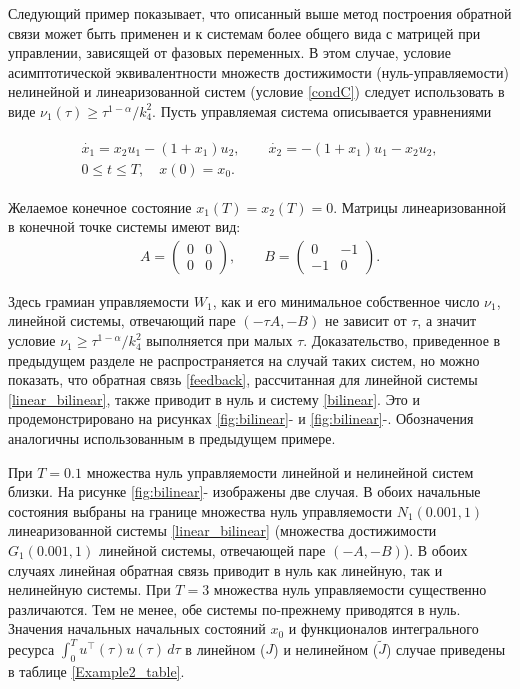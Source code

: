 \documentclass[../main.tex]{subfiles}
\begin{document}
\begin{pr}
Следующий пример показывает, что описанный выше метод построения обратной связи может быть применен и к системам более общего вида с матрицей при управлении, зависящей от фазовых переменных. В этом случае, условие  асимптотической эквивалентности  множеств достижимости (нуль-управляемости) нелинейной и линеаризованной систем (условие \ref{condC}) следует использовать в виде $ \nu_1(\tau) \geqslant \tau^{1 - \alpha} / k_4^2 $.   Пусть управляемая  система описывается уравнениями

\begin{gather}\label{bilinear}
\begin{gathered}
    \dot{x_1} = x_2 u_1 - (1 + x_1) u_2, \qquad \dot{x_2} = -(1+x_1) u_1 - x_2 u_2, \\
    0 \leqslant t \leqslant T, \quad
    x(0) = x_0.
    \end{gathered}
\end{gather}

Желаемое конечное состояние $ x_1(T) = x_2(T) =  0 $. Матрицы линеаризованной в конечной точке системы имеют вид:
\begin{gather}\label{linear_bilinear}
    A = \begin{pmatrix}
        0 & 0\\
        0 & 0
    \end{pmatrix}, \qquad 
    B = \begin{pmatrix}
        0 & -1 \\
        -1 & 0
    \end{pmatrix}.
\end{gather}
 
Здесь грамиан управляемости $ W_1 $, как и его минимальное собственное число $ \nu_1 $, линейной системы, отвечающий паре  $(-\tau A, -B) $ не зависит от $ \tau $, а значит условие $ \nu_1 \geqslant \tau^{1 - \alpha} / k_4^2 $ выполняется при малых $\tau$. Доказательство, приведенное в предыдущем разделе не распространяется на случай таких систем, но можно показать, что обратная связь \eqref{feedback}, рассчитанная для линейной системы \eqref{linear_bilinear},  также приводит в нуль и систему \eqref{bilinear}. Это и продемонстрировано на рисунках \ref{fig:bilinear}- и \ref{fig:bilinear}-. Обозначения аналогичны использованным в предыдущем примере. 

При $T = 0.1 $ множества нуль управляемости линейной и нелинейной систем близки. На рисунке \ref{fig:bilinear}- изображены две случая. В обоих начальные состояния выбраны на границе множества нуль управляемости $N_1(0.001,1)$  линеаризованной системы \eqref{linear_bilinear} (множества достижимости $G_1(0.001,1)$ линейной системы, отвечающей паре $(-A,-B)$). В обоих случаях линейная обратная связь приводит в нуль как линейную, так и нелинейную системы. При $ T = 3 $ множества нуль управляемости существенно различаются. Тем не менее, обе системы по-прежнему приводятся в нуль. Значения начальных начальных состояний $x_0$ и функционалов интегрального ресурса $ \displaystyle{\int_0^T u^{\top}(\tau) u(\tau) \, d\tau}$ в линейном ($ J $) и нелинейном ($ \widetilde{J} $) случае  приведены в таблице \ref{Example2_table}.
\end{pr}
\end{document}
